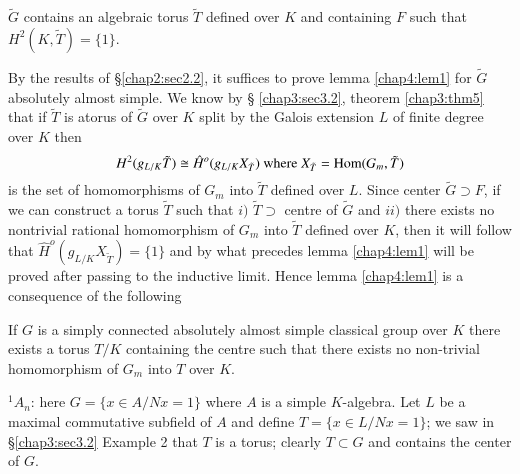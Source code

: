 \setcounter{lem}{0}
\begin{lem}\label{chap4:lem1}
$\tilde{G}$ contains an algebraic torus $\tilde{T}$ defined over $K$
  and containing $F$ such that $H^2 (K, \tilde{T}) = \{ 1 \}$. 

By the results of \S \ref{chap2:sec2.2}, it suffices to prove lemma
\ref{chap4:lem1} for 
$\tilde{G}$ absolutely almost simple. We know by \S
\ref{chap3:sec3.2}, theorem \ref{chap3:thm5} 
that if $\tilde{T}$ is a\pageoriginale torus of $\tilde{G}$ over $K$
split by the Galois extension $L$ of finite degree over $K$ then  
$$
H^2(g_{L/K}\tilde{T}) \cong \hat{H}^o (g_{L/K} X_{\tilde{T}}) \text{
  where } X_{\tilde{T}}= \operatorname{Hom} (G_m, \tilde{T}) 
$$
is the set of homomorphisms of $G_m$ into $\tilde{T}$ defined over
$L$. Since center $\tilde{G} \supset F$, if we can construct a torus
$\tilde{T}$ such that $i)$ $\tilde{T} \supset$ centre of $\tilde{G}$
and $ii)$ there exists no nontrivial rational homomorphism of $G_m$
into $\tilde{T}$ defined over $K$, then it will follow that
$\hat{H}^o (g_{L/K} X_{\tilde{T}}) = \{ 1 \}$ and by what precedes
lemma \ref{chap4:lem1} will be proved after passing to the inductive limit. Hence
lemma \ref{chap4:lem1} is a consequence of the following  
\end{lem}

\begin{lem}\label{chap4:lem2}
If $G$ is a simply connected absolutely almost simple classical
group over $K$ there exists a torus $T / K$ containing the centre such
that there exists no non-trivial homomorphism of $G_m$ into $T$ over
$K$.  
\end{lem}

\medskip
{} ${}^1A_n$: here $G = \{ x \in A/Nx = 1 \}$ where $A$ is a
simple $K$-algebra. Let $L$ be a maximal commutative subfield of $A$ and
define $T = \{ x \in L/Nx = 1 \}$; we saw in \S \ref{chap3:sec3.2}
Example 2 that 
$T$ is a torus; clearly $T \subset G$ and contains the center of $G$. 

